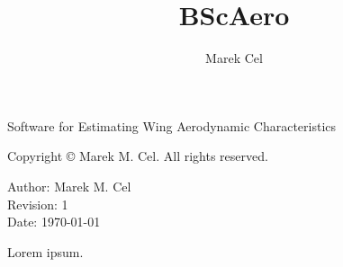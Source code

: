 \documentclass[12pt,a4paper]{report}
\title{BScAero}
\author{Marek Cel}
\date{}
\begin{document}
  
  \begin{titlepage}
    \centering
    {\huge \@title}
    \par Software for Estimating Wing Aerodynamic Characteristics\par
  \end{titlepage}
  

  \noindent Copyright \copyright{} \the\year{} Marek M. Cel. All rights reserved.

  \noindent Author: Marek M. Cel \\
  Revision: 1 \\
  Date: \today

  
  
  {
    \clearpage
    \setlength{\parskip}{0em}
    \tableofcontents
  }
  
  Lorem ipsum. \cite{Prosnak1970}

  
  \clearpage
   
  
  
\end{document}
